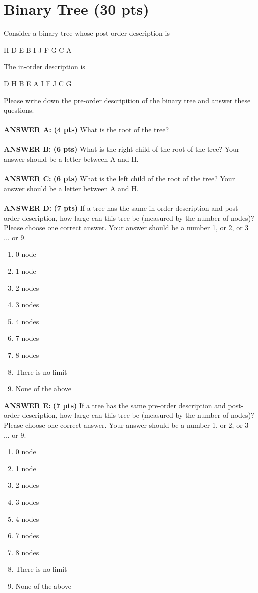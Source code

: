 \newpage
\section{Binary Tree (30 pts)} 

Consider a binary tree whose post-order description is

H  D  E  B  I  J  F  G  C  A

The in-order description is

D  H  B  E  A  I  F  J  C  G

Please write down the pre-order descripition of the binary tree
and answer these questions.
\\
~\\
{\bf ANSWER A: (4 pts)} What is the root of the tree?
\\
~\\
{\bf ANSWER B: (6 pts)} What is the right child of the root of the tree?
Your answer should be a letter between A and H.
\\
~\\
{\bf ANSWER C: (6 pts)} What is the left child of the root of the tree?
Your answer should be a letter between A and H.
\\
~\\
{\bf ANSWER D: (7 pts)} If a tree has the same in-order description and
post-order description, how large can this tree be (measured by the
number of nodes)?  Please choose one correct answer. Your answer
should be a number 1, or 2, or 3 ... or 9.

\begin{enumerate}
\item 0 node
\item 1 node
\item 2 nodes
\item 3 nodes
\item 4 nodes
\item 7 nodes
\item 8 nodes
\item There is no limit
\item None of the above
\end{enumerate}

{\bf ANSWER E: (7 pts)} If a tree has the same pre-order description and
post-order description, how large can this tree be (measured by the
number of nodes)?  Please choose one correct answer. Your answer
should be a number 1, or 2, or 3 ... or 9.

\begin{enumerate}
\item 0 node
\item 1 node
\item 2 nodes
\item 3 nodes
\item 4 nodes
\item 7 nodes
\item 8 nodes
\item There is no limit
\item None of the above
\end{enumerate}

